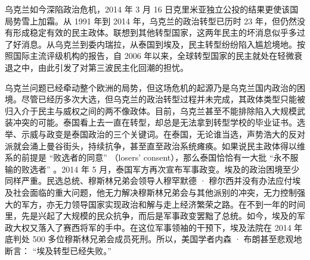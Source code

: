 





乌克兰如今深陷政治危机，2014 年 3 月 16 日克里米亚独立公投的结果更使该国局势雪上加霜。从 1991 年到 2014 年，乌克兰的政治转型已历时 23 年，但仍然没有形成稳定有效的民主政体。联想到其他转型国家，这两年民主的坏消息似乎多过了好消息。从乌克兰到委内瑞拉，从泰国到埃及，民主转型纷纷陷入尴尬境地。按照国际主流评级机构的报告，自 2006 年以来，全球转型国家的民主就处在轻微衰退之中，由此引发了对第三波民主化回潮的担忧。

乌克兰问题已经牵动整个欧洲的局势，但这场危机的起源乃是乌克兰国内政治的困境。尽管已经历多次大选，但乌克兰的政治转型过程并未完成，其政体类型只能被归入介于民主与威权之间的两不像政体。目前，乌克兰甚至不能排除陷入大规模武装冲突的可能。泰国看上去一直在转型，却总是无法拿到转型学校的毕业证书。选举、示威与政变是泰国政治的三个关键词。在泰国，无论谁当选，声势浩大的反对派就会涌上曼谷街头，持续抗争，甚至直至政治系统瘫痪。如果说民主政体得以维系的前提是 “败选者的同意” （losers' consent），那么泰国恰恰有一大批 “永不服输的败选者” 。2014 年 5 月，泰国军方再次宣布军事政变。埃及的政治困境至少同样严重。民选总统、穆斯林兄弟会领导人穆罕默德 · 穆尔西并没有办法应付埃及社会面临的重大问题，他无力解决穆斯林兄弟会与其他派别的冲突，无力控制强大的军方，亦无力领导国家实现政治和解与走上经济繁荣之路。在不到一年的时间里，先是兴起了大规模的民众抗争，而后是军事政变罢黜了总统。如今，埃及的军政大权又落入了赛西将军的手中。在这位军事领袖的干预下，埃及法院在 2014 年底判处 500 多位穆斯林兄弟会成员死刑。所以，美国学者内森 · 布朗甚至悲观地断言： “埃及转型已经失败。” 

